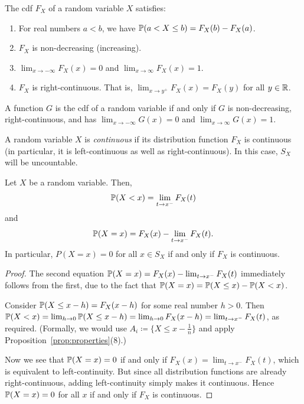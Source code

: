\begin{proposition}
  The cdf $F_X$ of a random variable $X$ satisfies:
  \begin{enumerate}
    \item For real numbers $a < b$, we have $\operatorname{\mathbb{P}}(a < X \le b) = F_X(b) - F_X(a)$.
    \item $F_X$ is non-decreasing (increasing).
    \item $\lim_{x \to -\infty} F_X(x) = 0$ and $\lim_{x \to \infty} F_X(x) = 1$.
    \item $F_X$ is right-continuous. That is, $\lim_{x \to y^{+}} F_X(x) = F_X(y)$ for all $y \in \mathbb{R}$.
  \end{enumerate}
\end{proposition}

\begin{proposition}
  A function $G$ is the cdf of a random variable if and only if  $G$ is non-decreasing, right-continuous, and has $\lim_{x\to -\infty} G(x) = 0$ and $\lim_{x \to \infty} G(x) = 1$.
\end{proposition}

\begin{definition}
  A random variable $X$ is \emph{continuous} if its distribution function $F_X$ is continuous (in particular, it is left-continuous as well as right-continuous). In this case, $S_X$ will be uncountable.
\end{definition}

\begin{proposition}
  Let $X$ be a random variable. Then,  \[
    \operatorname{\mathbb{P}}(X < x) =  \lim_{t \to x^{-}} F_X(t)
  \] and \[
    \operatorname{\mathbb{P}}(X = x) = F_X(x) - \lim_{t \to x^{-}} F_X(t).
  \] In particular, $P(X = x) = 0$ for all $x \in S_X$ if and only if $F_X$ is continuous.
\end{proposition}
\begin{proof}
  The second equation $\operatorname{\mathbb{P}}(X = x) = F_X(x) - \lim_{t \to x^{-}}F_X(t)$ immediately follows from the first, due to the fact that $\operatorname{\mathbb{P}}(X = x) = \operatorname{\mathbb{P}}(X \le x) - \operatorname{\mathbb{P}}(X < x)$.

  Consider $\operatorname{\mathbb{P}}(X \le x - h) = F_X(x - h)$ for some real number $h > 0$. Then $\operatorname{\mathbb{P}}(X < x) = \lim_{h \to 0} \operatorname{\mathbb{P}}(X \le x - h) = \lim_{h\to 0} F_X(x-h) = \lim_{t \to x^{-}}F_X(t)$, as required. (Formally, we would use $A_i \coloneq \{X \le x - \frac{1}{n} \}$ and apply Proposition~\ref{prop:properties}(8).)

  Now we see that $\operatorname{\mathbb{P}}(X = x) = 0$ if and only if $F_X(x) = \lim_{t\to x^{-}}F_X(t)$, which is equivalent to left-continuity. But since all distribution functions are already right-continuous, adding left-continuity simply makes it continuous. Hence  $\operatorname{\mathbb{P}}(X = x) = 0$ for all $x$ if and only if $F_X$ is continuous.
\end{proof}

